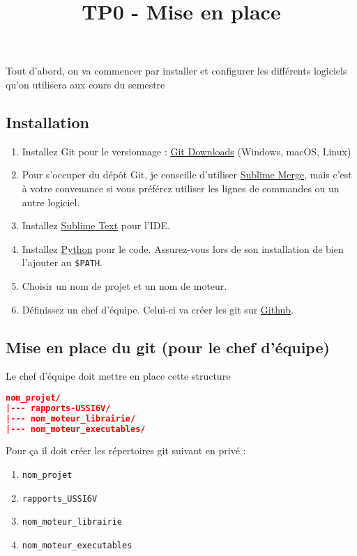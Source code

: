 \documentclass[a4paper,12pt]{article}
\title{TP0 - Mise en place}
\author{}
\date{}
\begin{document}
\makeonlytitle


Tout d'abord, on va commencer par installer et configurer les différents logiciels qu'on utilisera aux cours du semestre

\subsection{Installation}

\begin{enumerate}
    \item Installez Git pour le versionnage : \href{https://git-scm.com/downloads}{Git Downloads} (Windows, macOS, Linux)
    \item Pour s'occuper du dépôt Git, je conseille d'utiliser \href{https://www.sublimemerge.com/}{Sublime Merge}, mais c'est à votre convenance si vous préférez utiliser les lignes de commandes ou un autre logiciel.
    \item Installez \href{https://www.sublimetext.com/}{Sublime Text} pour l'IDE. 
    \item Installez \href{https://www.python.org/downloads/}{Python} pour le code. Assurez-vous lors de son installation de bien l'ajouter au \texttt{\$PATH}.
    \item Choisir un nom de projet et un nom de moteur. 
    \item Définissez un chef d'équipe. Celui-ci va créer les git sur \href{https://github.com/}{Github}. 
\end{enumerate}

\subsection{Mise en place du git (pour le chef d'équipe)}

Le chef d'équipe doit mettre en place cette structure
\begin{lstlisting}[language=json]
nom_projet/
|--- rapports-USSI6V/
|--- nom_moteur_librairie/
|--- nom_moteur_executables/
\end{lstlisting}

Pour ça il doit créer les répertoires git suivant en privé : 
\begin{enumerate}
    \item \texttt{nom\_projet} 
    \item \texttt{rapports\_USSI6V}
    \item \texttt{nom\_moteur\_librairie}
    \item \texttt{nom\_moteur\_executables}
\end{enumerate}
\end{document}
